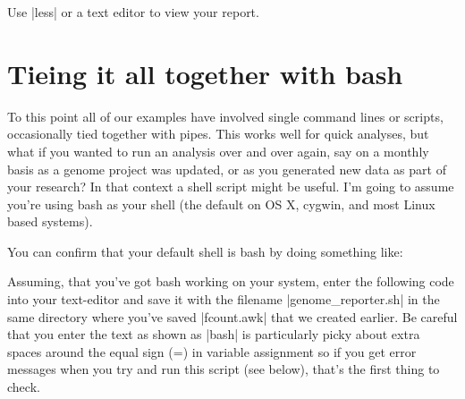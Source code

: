 
Use |less| or a text editor to view your report.

\section{Tieing it all together with bash}

To this point all of our examples have involved single command lines or scripts, occasionally tied together with pipes.  This works well for quick analyses, but what if you wanted to run an analysis over and over again, say on a monthly basis as a genome project was updated, or as you generated new data as part of your research?  In that context a shell script might be useful. I'm going to assume you're using bash as your shell (the default on OS X, cygwin, and most Linux based systems).

You can confirm that your default shell is bash by doing something like:

Assuming, that you've got bash working on your system, enter the following code into your text-editor and save it with the filename |genome_reporter.sh| in the same directory where you've saved |fcount.awk| that we created earlier. Be careful that you enter the text as shown as |bash| is particularly picky about extra spaces around the equal sign (=) in variable assignment so if you get error messages when you try and run this script (see below), that's the first thing to check.

